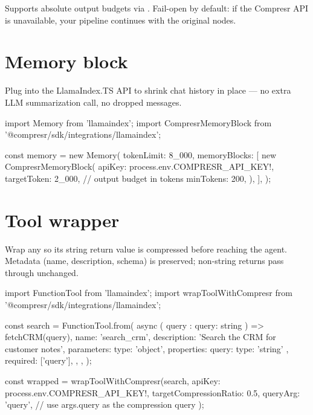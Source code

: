 \documentclass[10pt]{article}
\begin{document}
Supports absolute output budgets via .
Fail-open by default: if the Compresr API is unavailable, your pipeline
continues with the original nodes.

\section{Memory block}

Plug  into the LlamaIndex.TS
 API to shrink chat history in place --- no extra
LLM summarization call, no dropped messages.

\begin{tscode}
import { Memory } from 'llamaindex';
import { CompresrMemoryBlock }
  from '@compresr/sdk/integrations/llamaindex';

const memory = new Memory({
  tokenLimit: 8_000,
  memoryBlocks: [
    new CompresrMemoryBlock({
      apiKey: process.env.COMPRESR_API_KEY!,
      targetToken: 2_000,    // output budget in tokens
      minTokens: 200,
    }),
  ],
});
\end{tscode}

\section{Tool wrapper}

Wrap any  so its string return value is
compressed before reaching the agent. Metadata (name, description,
schema) is preserved; non-string returns pass through unchanged.

\begin{tscode}
import { FunctionTool } from 'llamaindex';
import { wrapToolWithCompresr }
  from '@compresr/sdk/integrations/llamaindex';

const search = FunctionTool.from(
  async ({ query }: { query: string }) => fetchCRM(query),
  {
    name: 'search_crm',
    description: 'Search the CRM for customer notes',
    parameters: {
      type: 'object',
      properties: { query: { type: 'string' } },
      required: ['query'],
    },
  },
);

const wrapped = wrapToolWithCompresr(search, {
  apiKey: process.env.COMPRESR_API_KEY!,
  targetCompressionRatio: 0.5,
  queryArg: 'query',   // use args.query as the compression query
});
\end{tscode}
\end{document}
